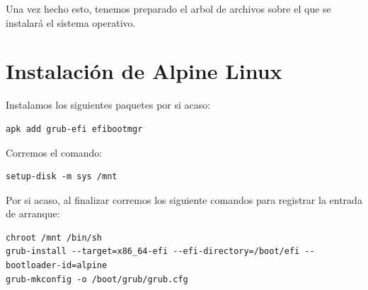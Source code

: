 \documentclass[11pt, letterpaper]{article}
\begin{document}
Una vez hecho esto, tenemos preparado el arbol de archivos sobre el que se instalará el sistema operativo.
\section{Instalación de Alpine Linux}
\label{sec:org4704938}

Instalamos los siguientes paquetes por si acaso:

\begin{verbatim}
apk add grub-efi efibootmgr
\end{verbatim}

Corremos el comando:

\begin{verbatim}
setup-disk -m sys /mnt
\end{verbatim}

Por si acaso, al finalizar corremos los siguiente comandos para registrar la entrada de arranque:

\begin{verbatim}
chroot /mnt /bin/sh
grub-install --target=x86_64-efi --efi-directory=/boot/efi --bootloader-id=alpine
grub-mkconfig -o /boot/grub/grub.cfg
\end{verbatim}
\end{document}

